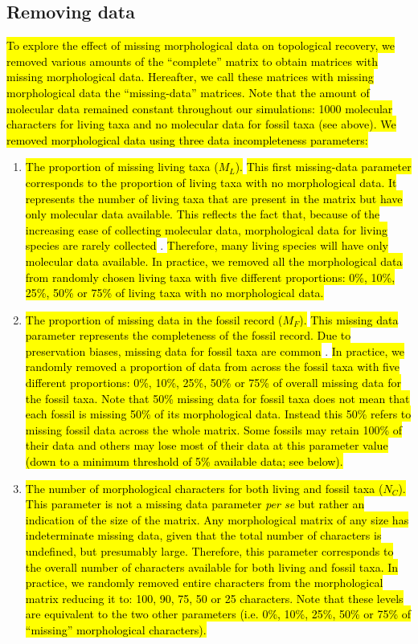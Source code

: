 \documentclass[12pt,letterpaper]{article}
\begin{document}
\subsection{Removing data}
\hl{To explore the effect of missing morphological data on topological recovery, we removed various amounts of the ``complete'' matrix to obtain matrices with missing morphological data.
Hereafter, we call these matrices with missing morphological data the ``missing-data'' matrices.
Note that the amount of molecular data remained constant throughout our simulations: 1000 molecular characters for living taxa and no molecular data for fossil taxa (see above).
We removed morphological data using three data incompleteness parameters:}
\begin{enumerate}
\item{\hl{The proportion of missing living taxa ($M_L$).}}
\hl{This first missing-data parameter corresponds to the proportion of living taxa with no morphological data. It represents the number of living taxa that are present in the matrix but have only molecular data available. This reflects the fact that, because of the increasing ease of collecting molecular data, morphological data for living species are rarely collected }\citep{GuillermeCooperMissing}.
\hl{Therefore, many living species will have only molecular data available.
In practice, we removed all the morphological data from randomly chosen living taxa with five different proportions: 0\%, 10\%, 25\%, 50\% or 75\% of living taxa with no morphological data.}
\item{\hl{The proportion of missing data in the fossil record ($M_F$).}}
\hl{This missing data parameter represents the completeness of the fossil record.
Due to preservation biases, missing data for fossil taxa are common }\citep{sansomfossilization2013}.
\hl{In practice, we randomly removed a proportion of data from across the fossil taxa with five different proportions: 0\%, 10\%, 25\%, 50\% or 75\% of overall missing data for the fossil taxa.
Note that 50\% missing data for fossil taxa does not mean that each fossil is missing 50\% of its morphological data.
Instead this 50\% refers to missing fossil data across the whole matrix.
Some fossils may retain 100\% of their data and others may lose most of their data at this parameter value (down to a minimum threshold of 5\% available data; see below).}
\item{\hl{The number of morphological characters for both living and fossil taxa ($N_C$).}}
\hl{This parameter is not a missing data parameter \textit{per se} but rather an indication of the size of the matrix.
Any morphological matrix of any size has indeterminate missing data, given that the total number of characters is undefined, but presumably large.
Therefore, this parameter corresponds to the overall number of characters available for both living and fossil taxa.
In practice, we randomly removed entire characters from the morphological matrix reducing it to: 100, 90, 75, 50 or 25 characters.
Note that these levels are equivalent to the two other parameters (i.e. 0\%, 10\%, 25\%, 50\% or 75\% of ``missing'' morphological characters).}
\end{enumerate}
\end{document}
